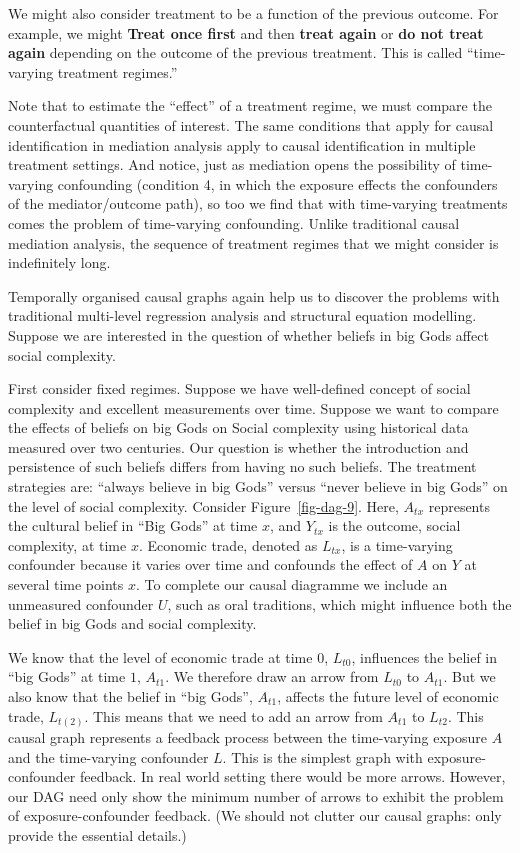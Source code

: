 \documentclass[
  singlecolumn]{report}
\begin{document}
We might also consider treatment to be a function of the previous
outcome. For example, we might \textbf{Treat once first} and then
\textbf{treat again} or \textbf{do not treat again} depending on the
outcome of the previous treatment. This is called ``time-varying
treatment regimes.''

Note that to estimate the ``effect'' of a treatment regime, we must
compare the counterfactual quantities of interest. The same conditions
that apply for causal identification in mediation analysis apply to
causal identification in multiple treatment settings. And notice, just
as mediation opens the possibility of time-varying confounding
(condition 4, in which the exposure effects the confounders of the
mediator/outcome path), so too we find that with time-varying treatments
comes the problem of time-varying confounding. Unlike traditional causal
mediation analysis, the sequence of treatment regimes that we might
consider is indefinitely long.

Temporally organised causal graphs again help us to discover the
problems with traditional multi-level regression analysis and structural
equation modelling. Suppose we are interested in the question of whether
beliefs in big Gods affect social complexity.

First consider fixed regimes. Suppose we have well-defined concept of
social complexity and excellent measurements over time. Suppose we want
to compare the effects of beliefs on big Gods on Social complexity using
historical data measured over two centuries. Our question is whether the
introduction and persistence of such beliefs differs from having no such
beliefs. The treatment strategies are: ``always believe in big Gods''
versus ``never believe in big Gods'' on the level of social complexity.
Consider Figure~\ref{fig-dag-9}. Here, \(A_{tx}\) represents the
cultural belief in ``Big Gods'' at time \(x\), and \(Y_{tx}\) is the
outcome, social complexity, at time \(x\). Economic trade, denoted as
\(L_{tx}\), is a time-varying confounder because it varies over time and
confounds the effect of \(A\) on \(Y\) at several time points \(x\). To
complete our causal diagramme we include an unmeasured confounder \(U\),
such as oral traditions, which might influence both the belief in big
Gods and social complexity.

We know that the level of economic trade at time \(0\), \(L_{t0}\),
influences the belief in ``big Gods'' at time \(1\), \(A_{t1}\). We
therefore draw an arrow from \(L_{t0}\) to \(A_{t1}\). But we also know
that the belief in ``big Gods'', \(A_{t1}\), affects the future level of
economic trade, \(L_{t(2)}\). This means that we need to add an arrow
from \(A_{t1}\) to \(L_{t2}\). This causal graph represents a feedback
process between the time-varying exposure \(A\) and the time-varying
confounder \(L\). This is the simplest graph with exposure-confounder
feedback. In real world setting there would be more arrows. However, our
DAG need only show the minimum number of arrows to exhibit the problem
of exposure-confounder feedback. (We should not clutter our causal
graphs: only provide the essential details.)
\end{document}

